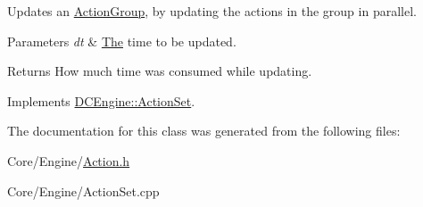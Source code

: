 Updates an \hyperlink{classDCEngine_1_1ActionGroup}{Action\-Group}, by updating the actions in the group in parallel. 


\begin{DoxyParams}{Parameters}
{\em dt} & \hyperlink{classThe}{The} time to be updated. \\
\hline
\end{DoxyParams}
\begin{DoxyReturn}{Returns}
How much time was consumed while updating. 
\end{DoxyReturn}


Implements \hyperlink{classDCEngine_1_1ActionSet}{D\-C\-Engine\-::\-Action\-Set}.



The documentation for this class was generated from the following files\-:\begin{DoxyCompactItemize}
\item 
Core/\-Engine/\hyperlink{Action_8h}{Action.\-h}\item 
Core/\-Engine/Action\-Set.\-cpp\end{DoxyCompactItemize}
